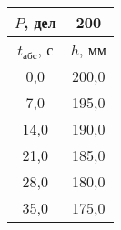 \begin{tabular}[t]{|c|c|}
\hline
$P$, дел & 200 \\
\hline
$t_{абс}$, с & $h$, мм \\ 
\hline
0,0 & 200,0 \\ 
7,0 & 195,0 \\ 
14,0 & 190,0 \\ 
21,0 & 185,0 \\ 
28,0 & 180,0 \\ 
35,0 & 175,0 \\ 
\hline
\end{tabular}
